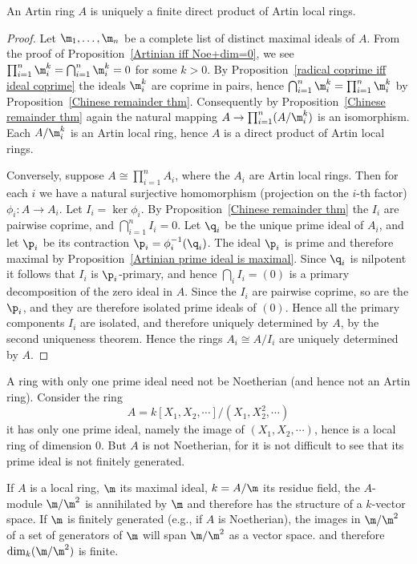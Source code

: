 \begin{theorem}\label{Art structure thm}
An Artin ring $A$ is uniquely a finite direct product of Artin local rings.
\end{theorem}
\begin{proof}
Let $\m_1,\dots,\m_n$ be a complete list of distinct maximal ideals of $A$. From the proof of Proposition~\ref{Artinian iff Noe+dim=0}, we see $\prod_{i=1}^{n}\m_i^k=\bigcap_{i=1}^{n}\m_i^k=0$ for some $k>0$. By Proposition~\ref{radical coprime iff ideal coprime} the ideals $\m_i^k$ are coprime in pairs, hence $\bigcap_{i=1}^n\m_i^k=\prod_{i=1}^{n}\m_i^k$ by Proposition~\ref{Chinese remainder thm}. Consequently by Proposition~\ref{Chinese remainder thm} again the natural mapping $A\to\prod_{i=1}^{n}(A/\m_i^k)$ is an isomorphism. Each $A/\m_i^k$ is an Artin local ring, hence $A$ is a direct product of Artin local rings.\par
Conversely, suppose $A\cong\prod_{i=1}^{n}A_i$, where the $A_i$ are Artin local rings. Then for each $i$ we have a natural surjective homomorphism (projection on the $i$-th factor) $\phi_i:A\to A_i$. Let $I_i=\ker\phi_i$. By Proposition~\ref{Chinese remainder thm} the $I_i$ are pairwise coprime, and $\bigcap_{i=1}^nI_i=0$. Let $\q_i$ be the unique prime ideal of $A_i$, and let $\p_i$ be its contraction $\p_i=\phi_i^{-1}(\q_i)$. The ideal $\p_i$ is prime and therefore maximal by Proposition~\ref{Artinian prime ideal is maximal}. Since $\q_i$ is nilpotent it follows that $I_i$ is $\p_i$-primary, and hence $\bigcap_iI_i=(0)$ is a primary decomposition of the zero ideal in $A$. Since the $I_i$ are pairwise coprime, so are the $\p_i$, and they are therefore isolated prime ideals of $(0)$. Hence all the primary components $I_i$ are isolated, and therefore uniquely determined by $A$, by the second uniqueness theorem. Hence the rings $A_i\cong A/I_i$ are uniquely determined by $A$.
\end{proof}
\begin{example}
A ring with only one prime ideal need not be Noetherian (and hence not an Artin ring). Consider the ring
\[A=k[X_1,X_2,\cdots]/(X_1,X_2^2,\cdots)\]
it has only one prime ideal, namely the image of $(X_1,X_2,\cdots)$, hence is a local ring of dimension $0$. But $A$ is not Noetherian, for it is not difficult to see that its prime ideal is not finitely generated.
\end{example}
If $A$ is a local ring, $\m$ its maximal ideal, $k=A/\m$ its residue field, the
$A$-module $\m/\m^2$ is annihilated by $\m$ and therefore has the structure of a $k$-vector space. If $\m$ is finitely generated (e.g., if $A$ is Noetherian), the images in $\m/\m^2$ of a set of generators of $\m$ will span $\m/\m^2$ as a vector space. and therefore $\dim_k(\m/\m^2)$ is finite.
